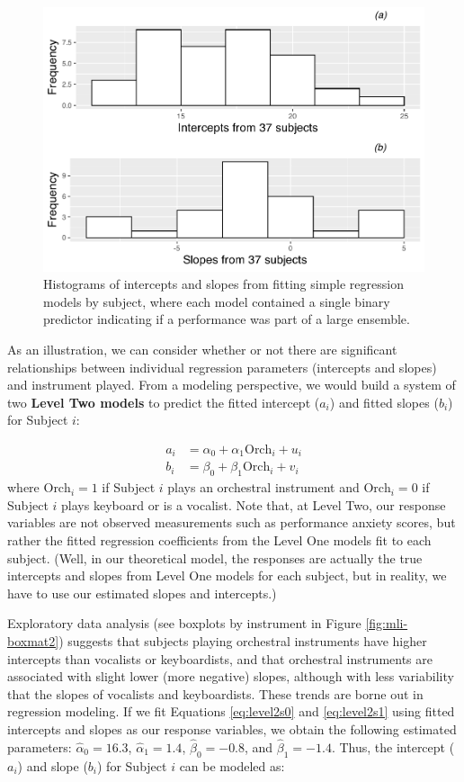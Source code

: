 \documentclass[
]{krantz}
\begin{document}
\begin{figure}

{\centering \includegraphics[width=0.6\linewidth]{bookdown-BeyondMLR_files/figure-latex/mli-histmat2-1} 

}

\caption{Histograms of intercepts and slopes from fitting simple regression models by subject, where each model contained a single binary predictor indicating if a performance was part of a large ensemble.}\label{fig:mli-histmat2}
\end{figure}

As an illustration, we can consider whether or not there are significant relationships between individual regression parameters (intercepts and slopes) and instrument played. From a modeling perspective, we would build a system of two \textbf{Level Two models}  to predict the fitted intercept (\(a_{i}\)) and fitted slopes (\(b_{i}\)) for Subject \(i\):

\begin{align}
a_{i} & =  \alpha_{0}+\alpha_{1}\textrm{Orch}_{i}+u_{i}
\label{eq:level2s0}  \\
b_{i} & =  \beta_{0}+\beta_{1}\textrm{Orch}_{i}+v_{i}
\label{eq:level2s1}
\end{align}
where \(\textrm{Orch}_{i}=1\) if Subject \(i\) plays an orchestral instrument and \(\textrm{Orch}_{i}=0\) if Subject \(i\) plays keyboard or is a vocalist. Note that, at Level Two, our response variables are not observed measurements such as performance anxiety scores, but rather the fitted regression coefficients from the Level One models fit to each subject. (Well, in our theoretical model, the responses are actually the true intercepts and slopes from Level One models for each subject, but in reality, we have to use our estimated slopes and intercepts.)

Exploratory data analysis (see boxplots by instrument in Figure \ref{fig:mli-boxmat2}) suggests that subjects playing orchestral instruments have higher intercepts than vocalists or keyboardists, and that orchestral instruments are associated with slight lower (more negative) slopes, although with less variability that the slopes of vocalists and keyboardists. These trends are borne out in regression modeling. If we fit Equations \eqref{eq:level2s0} and \eqref{eq:level2s1} using fitted intercepts and slopes as our response variables, we obtain the following estimated parameters: \(\hat{\alpha}_{0}=16.3\), \(\hat{\alpha}_{1}=1.4\), \(\hat{\beta}_{0}=-0.8\), and \(\hat{\beta}_{1}=-1.4\). Thus, the intercept (\(a_{i}\)) and slope (\(b_{i}\)) for Subject \(i\) can be modeled as:
\end{document}
